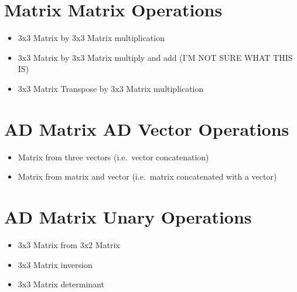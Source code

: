 \documentclass[11pt]{article}
\begin{document}
\section{Matrix Matrix Operations}\label{sec:matrix-matrix-operations}
    \begin{itemize}
        \item 3x3 Matrix by 3x3 Matrix multiplication
        \item 3x3 Matrix by 3x3 Matrix multiply and add (I'M NOT SURE WHAT THIS IS)
        \item 3x3 Matrix Transpose by 3x3 Matrix multiplication
    \end{itemize}



\section{AD Matrix AD Vector Operations}\label{sec:ad-matrix-ad-vector-operations}
    \begin{itemize}
        \item Matrix from three vectors (i.e.\ vector concatenation)
        \item Matrix from matrix and vector (i.e.\ matrix concatenated with a vector)
    \end{itemize}

\section{AD Matrix Unary Operations}\label{sec:ad-matrix-unary-operations}
    \begin{itemize}
        \item 3x3 Matrix from 3x2 Matrix
        \item 3x3 Matrix inversion
        \item 3x3 Matrix determinant
    \end{itemize}
\end{document}
